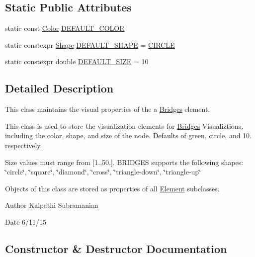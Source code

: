 \subsection*{Static Public Attributes}
\begin{DoxyCompactItemize}
\item 
static const \hyperlink{classbridges_1_1_color}{Color} \hyperlink{classbridges_1_1_element_visualizer_ade224640b18e3f6eed42098ea0ad5b3a}{D\+E\+F\+A\+U\+L\+T\+\_\+\+C\+O\+L\+O\+R}
\item 
static constexpr \hyperlink{namespacebridges_a1b4050586bd708782ae0d4f3b06b9579}{Shape} \hyperlink{classbridges_1_1_element_visualizer_a2800a212357180e4941a818b958aabd9}{D\+E\+F\+A\+U\+L\+T\+\_\+\+S\+H\+A\+P\+E} = \hyperlink{namespacebridges_a1b4050586bd708782ae0d4f3b06b9579aa968bf0f7aeccbae1a40751345bf2e64}{C\+I\+R\+C\+L\+E}
\item 
static constexpr double \hyperlink{classbridges_1_1_element_visualizer_a81cc788d6149d5d582099cbc35e18c5a}{D\+E\+F\+A\+U\+L\+T\+\_\+\+S\+I\+Z\+E} = 10
\end{DoxyCompactItemize}


\subsection{Detailed Description}
This class maintains the visual properties of the a \hyperlink{namespacebridges_1_1_bridges}{Bridges} element. 

This class is used to store the visualization elements for \hyperlink{namespacebridges_1_1_bridges}{Bridges} Visualiztions, including the color, shape, and size of the node. Defaults of green, circle, and 10. respectively.

Size values must range from \mbox{[}1.,50.\mbox{]}. B\+R\+I\+D\+G\+E\+S supports the following shapes\+: \char`\"{}circle\char`\"{}, \char`\"{}square\char`\"{}, \char`\"{}diamond\char`\"{}, \char`\"{}cross\char`\"{}, \char`\"{}triangle-\/down\char`\"{}, \char`\"{}triangle-\/up\char`\"{}

Objects of this class are stored as properties of all \hyperlink{classbridges_1_1_element}{Element} subclasses.

\begin{DoxyAuthor}{Author}
Kalpathi Subramanian 
\end{DoxyAuthor}
\begin{DoxyDate}{Date}
6/11/15 
\end{DoxyDate}


\subsection{Constructor \& Destructor Documentation}
\hypertarget{classbridges_1_1_element_visualizer_af792c8b0aaa76d07f5806df83f27ccb6}{}
